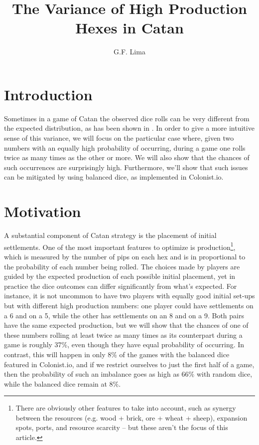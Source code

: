 \documentclass[11pt]{article}
\title{The Variance of High Production Hexes in Catan}
\author{G.F. Lima}
\begin{document}
\maketitle
\section{Introduction}

Sometimes in a game of Catan the observed dice rolls can be very different from the expected distribution, as has been shown in \cite{DBD}. In order to give a more intuitive sense of this variance, we will focus on the particular case where, given two numbers with an equally high probability of occurring, during a game one rolls twice as many times as the other or more. We will also show that the chances of such occurrences are surprisingly high. Furthermore, we'll show that such issues can be mitigated by using balanced dice, as implemented in Colonist.io.


\section{Motivation}


A substantial component of Catan strategy is the placement of initial settlements. One of the most important features to optimize is production\footnote{There are obviously other features to take into account, such as synergy between the resources (e.g. wood + brick, ore + wheat + sheep), expansion spots, ports, and resource scarcity -- but these aren't the focus of this article.}, which is measured by the number of pips on each hex and is in proportional to the probability of each number being rolled. The choices made by players are guided by the expected production of each possible initial placement, yet in practice the dice outcomes can differ significantly from what's expected. For instance, it is not uncommon to have two players with equally good initial set-ups but with different high production numbers: one player could have settlements on a 6 and on a 5, while the  other has settlements on an 8 and on a 9. Both pairs have the same expected production, but we will show that the chances of one of these numbers rolling at least twice as many times as its counterpart during a game is roughly 37\%, even though they have equal probability of occurring. In contrast, this will happen in only $8\%$ of the games with the balanced dice featured in Colonist.io, and if we restrict ourselves to just the first half of a game, then the probability of such an imbalance goes as high as $66\%$ with random dice, while the balanced dice remain at $8\%$.
\end{document}
